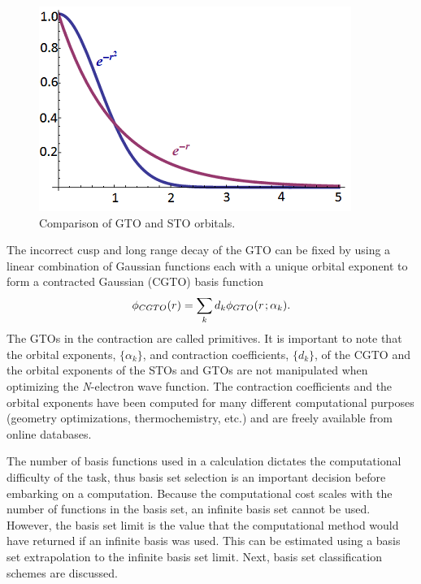 \documentclass[11pt,oneside,final]{huthesis}%
\begin{document}
\begin{figure}
	\begin{center}
 \includegraphics{./figures/image1.png}
\caption{Comparison of GTO and STO orbitals.}
	\end{center}\label{fig:fal}
\end{figure}

The incorrect cusp and long range decay of the GTO can be fixed by using a linear combination of Gaussian functions each with a unique orbital exponent to form a contracted Gaussian (CGTO) basis function
\begin{equation*}%
\phi _{CGTO} (r{\bf )}=\sum _{k}d_{k}  \phi _{GTO} (r{\kern 1pt} ;\alpha _{k} ).    
\end{equation*} 
The GTOs in the contraction are called primitives.  It is important to note that the orbital exponents, $\{\alpha_k\}$, and contraction coefficients, $\{d_k\}$, of the CGTO and the orbital exponents of the STOs and GTOs are not manipulated when optimizing the \textit{N}-electron wave function.  The contraction coefficients and the orbital exponents have been computed for many different computational purposes (geometry optimizations, thermochemistry, etc.) and are freely available from online databases. 

The number of basis functions used in a calculation dictates the computational difficulty of the task, thus basis set selection is an important decision before embarking on a computation.  Because the computational cost scales with the number of functions in the basis set, an infinite basis set cannot be used.  However, the {basis set limit} is the value that the computational method would have returned if an infinite basis was used.  This can be estimated using a basis set extrapolation to the infinite basis set limit. Next, basis set classification schemes are discussed.  
\end{document}
